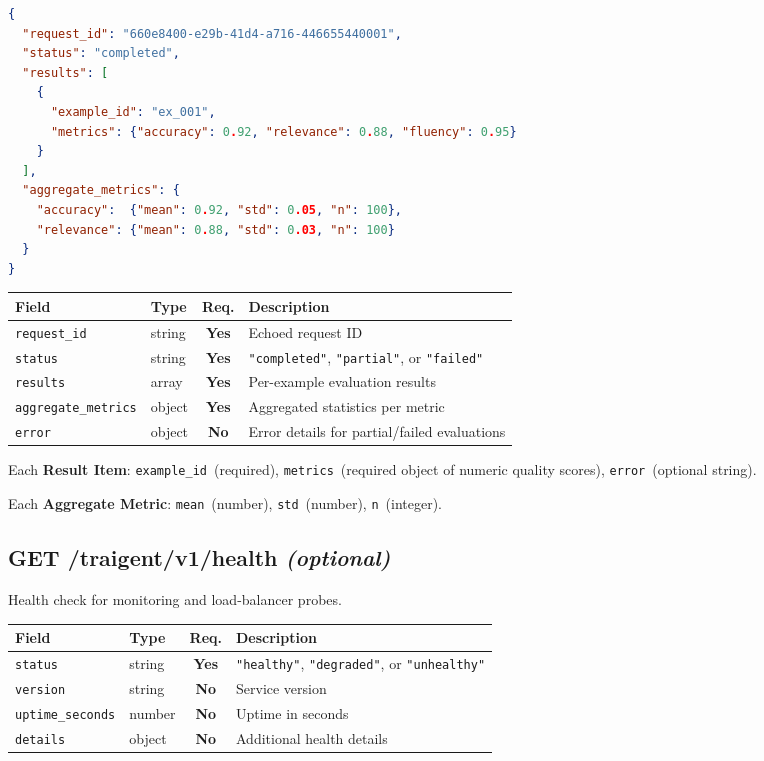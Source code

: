\documentclass[11pt,a4paper]{article}
\newcommand{\field}[1]{\texttt{#1}}
\newcommand{\required}{\textbf{Yes}}
\newcommand{\optional}{\textbf{No}}
\newcommand{\status}[1]{\texttt{"#1"}}
\begin{document}
\begin{lstlisting}[language=json]
{
  "request_id": "660e8400-e29b-41d4-a716-446655440001",
  "status": "completed",
  "results": [
    {
      "example_id": "ex_001",
      "metrics": {"accuracy": 0.92, "relevance": 0.88, "fluency": 0.95}
    }
  ],
  "aggregate_metrics": {
    "accuracy":  {"mean": 0.92, "std": 0.05, "n": 100},
    "relevance": {"mean": 0.88, "std": 0.03, "n": 100}
  }
}
\end{lstlisting}

\begin{center}\small
\begin{tabularx}{\textwidth}{@{}llcX@{}}
\toprule
\textbf{Field} & \textbf{Type} & \textbf{Req.} & \textbf{Description} \\
\midrule
\field{request\_id}        & string & \required & Echoed request ID \\
\field{status}             & string & \required & \status{completed}, \status{partial}, or \status{failed} \\
\field{results}            & array  & \required & Per-example evaluation results \\
\field{aggregate\_metrics} & object & \required & Aggregated statistics per metric \\
\field{error}              & object & \optional & Error details for partial/failed evaluations \\
\bottomrule
\end{tabularx}
\end{center}

Each \textbf{Result Item}: \field{example\_id}~(required), \field{metrics}~(required object of numeric quality scores), \field{error}~(optional string).

Each \textbf{Aggregate Metric}: \field{mean}~(number), \field{std}~(number), \field{n}~(integer).

\subsection{GET /traigent/v1/health \normalfont\textit{(optional)}}

Health check for monitoring and load-balancer probes.

\begin{center}\small
\begin{tabularx}{\textwidth}{@{}llcX@{}}
\toprule
\textbf{Field} & \textbf{Type} & \textbf{Req.} & \textbf{Description} \\
\midrule
\field{status}          & string & \required & \status{healthy}, \status{degraded}, or \status{unhealthy} \\
\field{version}         & string & \optional & Service version \\
\field{uptime\_seconds} & number & \optional & Uptime in seconds \\
\field{details}         & object & \optional & Additional health details \\
\bottomrule
\end{tabularx}
\end{center}
\end{document}
